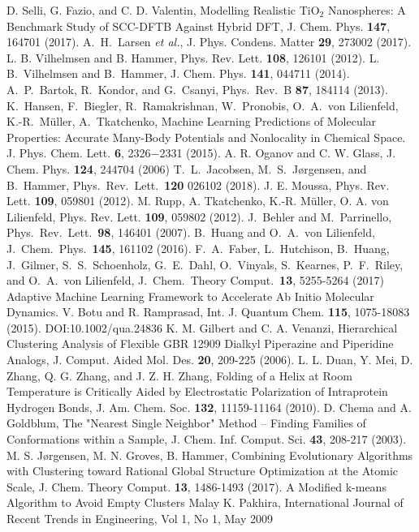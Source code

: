 \documentclass[aip,amsmath,amssymb,reprint]{revtex4-1}
\begin{document}
\begin{thebibliography}{12}
D. Selli, G. Fazio, and C. D. Valentin, {Modelling Realistic TiO$_2$ Nanospheres: A Benchmark Study of SCC-DFTB Against Hybrid DFT}, J. Chem. Phys. \textbf{147}, 164701 (2017).
A.\ H.\ Larsen \textit{et al.}, J. Phys. Condens. Matter \textbf{29}, 273002 (2017).
L. B. Vilhelmsen and B. Hammer, Phys. Rev. Lett. \textbf{108}, 126101 (2012).
L. B.\ Vilhelmsen and B.\ Hammer, J. Chem. Phys. \textbf{141}, 044711 (2014).
 A.\ P.\ Bartok, R.\ Kondor, and G.\ Csanyi, Phys.\ Rev.\ B \textbf{87}, 184114 (2013).
K.\ Hansen, F.\ Biegler, R.\ Ramakrishnan, W.\ Pronobis, O.\ A.\ von Lilienfeld, K.-R.\ M{\"u}ller, A.\ Tkatchenko, Machine Learning Predictions of Molecular Properties: Accurate Many-Body Potentials and Nonlocality in Chemical Space. J. Phys. Chem. Lett. \textbf{6}, 2326−2331 (2015).
A. R. Oganov and C. W. Glass, J. Chem. Phys. \textbf{124}, 244704 (2006)
T.\ L.\ Jacobsen, M.\ S.\ J{\o}rgensen, and B.\ Hammer, Phys.\ Rev.\ Lett.\ \textbf{120} 026102 (2018).
 J. E. Moussa, Phys. Rev. Lett. \textbf{109}, 059801 (2012).
M. Rupp, A. Tkatchenko, K.-R. M{\"u}ller, O. A. von Lilienfeld, Phys. Rev. Lett. \textbf{109}, 059802 (2012).
J.\ Behler and M.\ Parrinello, Phys.\ Rev.\ Lett.\ \textbf{98}, 146401 (2007).
B.\ Huang and O.\ A.\ von Lilienfeld, J.\ Chem.\ Phys.\ \textbf{145}, 161102 (2016).
F.\ A.\ Faber, L.\ Hutchison, B.\ Huang, J.\ Gilmer, S.\ S.\ Schoenholz, G.\ E.\ Dahl, O.\ Vinyals, S.\ Kearnes, P.\ F.\ Riley, and O.\ A.\ von Lilienfeld, J.\ Chem.\ Theory Comput.\ \textbf{13}, 5255-5264 (2017)
 {Adaptive Machine Learning Framework to Accelerate Ab Initio Molecular Dynamics.} V. Botu and R. Ramprasad, Int. J. Quantum Chem. \textbf{115}, 1075-18083 (2015). DOI:10.1002/qua.24836 
 K. M. Gilbert and C. A. Venanzi, {Hierarchical Clustering Analysis of Flexible GBR 12909 Dialkyl Piperazine and Piperidine Analogs}, J. Comput. Aided Mol. Des. \textbf{20}, 209-225 (2006).  
 L. L. Duan, Y. Mei, D. Zhang, Q. G. Zhang, and J. Z. H. Zhang, {Folding of a Helix at Room Temperature is Critically Aided by Electrostatic Polarization of Intraprotein Hydrogen Bonds}, J. Am. Chem. Soc. \textbf{132}, 11159-11164 (2010).
 D. Chema and A. Goldblum, {The "Nearest Single Neighbor" Method -- Finding Families of Conformations within a Sample}, J. Chem. Inf. Comput. Sci. \textbf{43}, 208-217 (2003). 
 M. S. J{\o}rgensen, M. N. Groves, B. Hammer, {Combining Evolutionary Algorithms with Clustering toward Rational Global Structure Optimization at the Atomic Scale}, J. Chem. Theory Comput. \textbf{13}, 1486-1493 (2017). 
 {A Modified k-means Algorithm to Avoid Empty Clusters} Malay K. Pakhira, International Journal of Recent Trends in Engineering, Vol 1, No 1, May 2009
\end{thebibliography}
\end{document}
